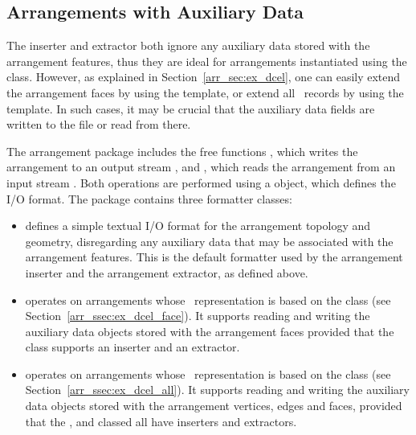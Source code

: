 \begin{ccAdvanced}
\subsection{Arrangements with Auxiliary Data\label{arr_ssec:arr_io_aux_data}}

The inserter and extractor both ignore any auxiliary data stored with
the arrangement features, thus they are ideal for arrangements
instantiated using the  class.
However, as explained in Section~\ref{arr_sec:ex_dcel}, one can easily
extend the arrangement faces by using the 
template, or extend all \dcel\ records by using the 
template. In such cases, it may be crucial that the auxiliary data fields
are written to the file or read from there.

The arrangement package includes the free functions
, which writes the arrangement 
to an output stream , and , which
reads the arrangement  from an input stream . Both
operations are performed using a  object, which defines
the I/O format. The package contains three formatter classes:
\begin{itemize}
\item {} defines a simple textual
I/O format for the arrangement topology and geometry, disregarding any
auxiliary data that may be associated with the arrangement features.
This is the default formatter used by the arrangement inserter and the
arrangement extractor, as defined above.
%
\item {} operates on
arrangements whose \dcel\ representation is based on the
 class (see
Section~\ref{arr_ssec:ex_dcel_face}). It supports reading and writing
the auxiliary data objects stored with the arrangement faces provided
that the  class supports an inserter and an extractor.
%
\item {} operates on
arrangements whose \dcel\ representation is based on the
 class
(see Section~\ref{arr_ssec:ex_dcel_all}). It supports reading and writing
the auxiliary data objects stored with the arrangement vertices, edges
and faces, provided that the ,  and
 classed all have inserters and extractors.
\end{itemize}


\end{ccAdvanced}
